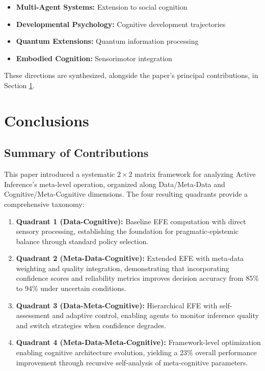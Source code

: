 \documentclass[
]{article}
\providecommand{\tightlist}{%
  \setlength{\itemsep}{0pt}\setlength{\parskip}{0pt}}
\begin{document}
\begin{itemize}
\tightlist
\item
  \textbf{Multi-Agent Systems:} Extension to social cognition
\item
  \textbf{Developmental Psychology:} Cognitive development trajectories
\item
  \textbf{Quantum Extensions:} Quantum information processing
\item
  \textbf{Embodied Cognition:} Sensorimotor integration
\end{itemize}

These directions are synthesized, alongside the paper's principal
contributions, in Section \ref{sec:conclusions}.

\newpage

\section{Conclusions}\label{sec:conclusions}

\subsection{Summary of Contributions}\label{summary-of-contributions}

This paper introduced a systematic \(2 \times 2\) matrix framework for
analyzing Active Inference's meta-level operation, organized along
Data/Meta-Data and Cognitive/Meta-Cognitive dimensions. The four
resulting quadrants provide a comprehensive taxonomy:

\begin{enumerate}
\def\labelenumi{\arabic{enumi}.}
\item
  \textbf{Quadrant 1 (Data-Cognitive):} Baseline EFE computation with
  direct sensory processing, establishing the foundation for
  pragmatic-epistemic balance through standard policy selection.
\item
  \textbf{Quadrant 2 (Meta-Data-Cognitive):} Extended EFE with meta-data
  weighting and quality integration, demonstrating that incorporating
  confidence scores and reliability metrics improves decision accuracy
  from 85\% to 94\% under uncertain conditions.
\item
  \textbf{Quadrant 3 (Data-Meta-Cognitive):} Hierarchical EFE with
  self-assessment and adaptive control, enabling agents to monitor
  inference quality and switch strategies when confidence degrades.
\item
  \textbf{Quadrant 4 (Meta-Data-Meta-Cognitive):} Framework-level
  optimization enabling cognitive architecture evolution, yielding a
  23\% overall performance improvement through recursive self-analysis
  of meta-cognitive parameters.
\end{enumerate}
\end{document}
